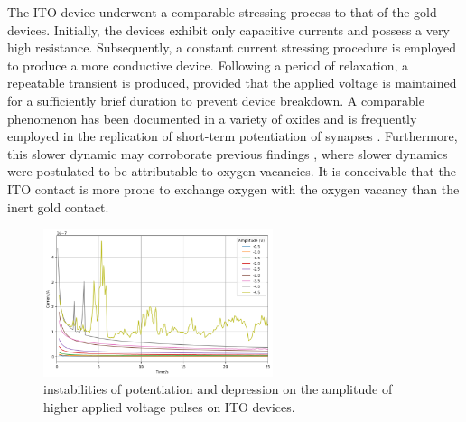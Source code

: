 

\noindent The ITO device underwent a comparable stressing process to that of the gold devices. Initially, the devices exhibit only capacitive currents and possess a very high resistance. Subsequently, a constant current stressing procedure is employed to produce a more conductive device. Following a period of relaxation, a repeatable transient is produced, provided that the applied voltage is maintained for a sufficiently brief duration to prevent device breakdown. A comparable phenomenon has been documented in a variety of oxides \cite{moon2019rram} and is frequently employed in the replication of short-term potentiation of synapses \cite{zhang2017emulating, chang2011short}. Furthermore, this slower dynamic may corroborate previous findings \cite{meyer2005oxygen}, where slower dynamics were postulated to be attributable to oxygen vacancies. It is conceivable that the ITO contact is more prone to exchange oxygen with the oxygen vacancy than the inert gold contact.\\

\begin{figure}[htbp!] 
    \centering    
    \includegraphics[width=0.6\textwidth]{Chapter5/Figs/c.png}
    \caption[instabilities of potentiation and depression on the amplitude of applied voltage pulses.]{instabilities of potentiation and depression on the amplitude of higher applied voltage pulses on ITO devices.}
    \label{fig:5c}
\end{figure}

